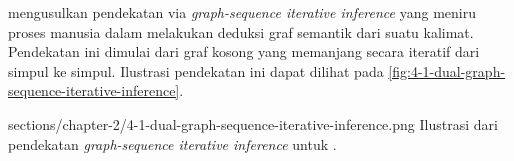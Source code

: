 \textcite{cai2020} mengusulkan pendekatan \amrparsing{} via \textit{graph-sequence iterative inference} yang meniru proses manusia dalam melakukan deduksi graf semantik dari suatu kalimat.
Pendekatan ini dimulai dari graf kosong yang memanjang secara iteratif dari simpul ke simpul.
Ilustrasi pendekatan ini dapat dilihat pada \cref{fig:4-1-dual-graph-sequence-iterative-inference}.


  {sections/chapter-2/4-1-dual-graph-sequence-iterative-inference.png}
  {Ilustrasi dari pendekatan \textit{graph-sequence iterative inference} untuk \amrparsing{} .}
